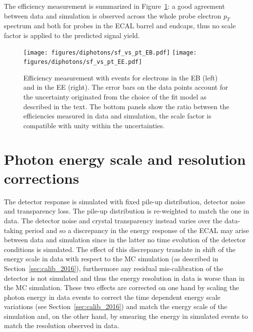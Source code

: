 The efficiency measurement is summarized in Figure~\ref{fig:tnp}: a good agreement between data and simulation is
observed across the whole probe electron $p_T$ spectrum and both for probes in the  ECAL barrel and endcaps, thus no scale factor
is applied to the predicted signal yield.

\begin{figure}
  \centering
  \texttt{[image: figures/diphotons/sf\_vs\_pt\_EB.pdf]}
  \texttt{[image: figures/diphotons/sf\_vs\_pt\_EE.pdf]}
  \caption{Efficiency measurement with \Zee events for electrons in the EB (left) and in the EE (right).
    The error bars on the data points
    account for the uncertainty originated from the choice of the fit model as described in the text.
    The bottom panels show the ratio between the efficiencies measured in data and simulation, the scale factor is
    compatible with unity within the uncertainties.}
  \label{fig:tnp}    
\end{figure}


\clearpage
\section{Photon energy scale and resolution corrections}
\label{sec:dipho_energy}
The detector response is simulated with fixed pile-up distribution, detector noise and transparency loss.
The pile-up distribution is re-weighted to match the one in data.
The detector noise and crystal transparency instead varies over the data-taking period and so a discrepancy
in the energy response of the ECAL may arise between data and simulation since in the latter no time evolution
of the detector conditions is simulated. The effect of this discrepancy translate in shift of the energy
scale in data with respect to the MC simulation (as described in Section~\ref{sec:calib_2016}),
furthermore any residual mis-calibration of the detector
is not simulated and thus the energy resolution in data is worse than in the MC simulation.
These two effects are corrected on one hand by
scaling the photon energy in data events
to correct the time dependent energy scale variations (see Section~\ref{sec:calib_2016})
and match the energy scale of the simulation and,
on the other hand, by smearing the energy in simulated events to match the resolution observed in data.

